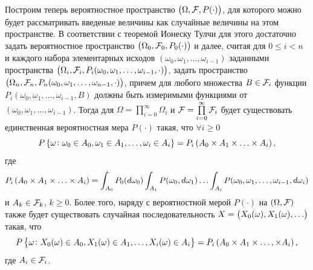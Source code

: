 \documentclass[a4paper,12pt,russian]{extarticle}
\begin{document}
Построим теперь 	вероятностное пространство $\left(\Omega, {\cal F}, P(\cdot)\right)$, для которого можно будет рассматривать введеные величины как случайные величины на этом пространстве. В соответствии с теоремой Ионеску Тулчи для этого достаточно задать вероятностное пространство $\left(\Omega_0, {\cal F}_0, P_0(\cdot)\right)$ и далее, считая для $0 \leqslant i < n$ и каждого набора элементарных исходов $(\omega_0, \omega_1, \ldots, \omega_{i-1})$ заданными пространства $\left(\Omega_i, {\cal F}_i, P_i(\omega_0,\omega_1,\ldots, \omega_{i-1},\cdot)\right)$, задать пространство $\left(\Omega_n, {\cal F}_n, P_n(\omega_0,\omega_1,\ldots, \omega_{n-1},\cdot)\right)$, причем для любого множества $B\in {\cal F}_i$ функции $P_i(\omega_0,\omega_1,\ldots, \omega_{i-1},B)$
должны быть измеримыми функциями от $(\omega_0, \omega_1, \ldots, \omega_{i-1})$. Тогда для $\Omega=\prod\limits_{i=0}^{\infty}\Omega_i$ и ${\cal F}=\prod\limits_{i=0}^{\infty} {\cal F}_i$ будет существовать единственная вероятностная мера $P(\cdot)$ такая, что $\forall i \geqslant 0$
\begin{equation}
P\left\{\omega \colon \omega_0 \in A_0, \omega_1 \in A_1, \ldots, \omega_i\in A_i\right\} = P_i\left(A_0 \times A_1 \times \ldots \times A_i\right),
\end{equation}
где 
\begin{equation}
 P_i\left(A_0 \times A_1 \times \ldots \times A_i\right) = \int_{A_0} P_0(d \omega_0) \int_{A_1} P(\omega_0,d \omega_1) \ldots \int_{A_i} P(\omega_0, \omega_1, \ldots, \omega_{i-1}, d \omega_i)
\end{equation}
и $A_k \in {\cal F}_k$, $k \geqslant 0$. Более того, наряду с вероятностной мерой $P(\cdot)$ на $(\Omega, {\cal F})$ также будет существовать случайная последовательность $X=\left(X_0(\omega), X_1(\omega), \ldots\right)$ такая, что
\begin{equation}
P\left\{\omega \colon X_0(\omega) \in A_0, X_1(\omega)\in A_1, \ldots, X_i(\omega)\in A_i\right\} = P_i\left(A_0\times A_1 \times \ldots, \times A_i\right),
\end{equation}
где $A_i\in {\cal F}_i$.
\end{document}
